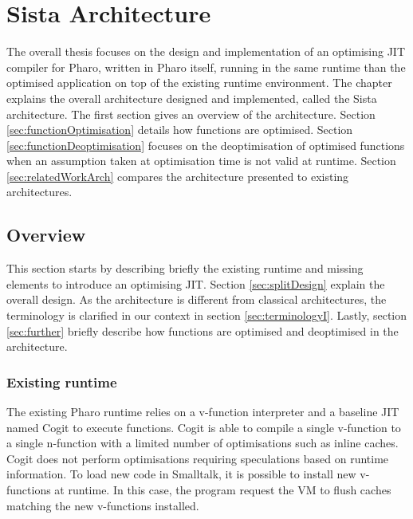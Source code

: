 \documentclass[a4paper,12pt,twoside]{../includes/ThesisStyle}
\begin{document}
\fi

\chapter{Sista Architecture}
\label{chap:architecture}
\minitoc

The overall thesis focuses on the design and implementation of an optimising JIT compiler for Pharo, written in Pharo itself, running in the same runtime than the optimised application on top of the existing runtime environment. The chapter explains the overall architecture designed and implemented, called the Sista architecture. The first section gives an overview of the architecture. Section \ref{sec:functionOptimisation} details how functions are optimised. Section \ref{sec:functionDeoptimisation} focuses on the deoptimisation of optimised functions when an assumption taken at optimisation time is not valid at runtime. Section \ref{sec:relatedWorkArch} compares the architecture presented to existing architectures.


\section{Overview}

This section starts by describing briefly the existing runtime and missing elements to introduce an optimising JIT. Section \ref{sec:splitDesign} explain the overall design. As the architecture is different from classical architectures, the terminology is clarified in our context in section \ref{sec:terminologyI}. Lastly, section \ref{sec:further} briefly describe how functions are optimised and deoptimised in the architecture. 

\subsection{Existing runtime}

The existing Pharo runtime relies on a v-function interpreter and a baseline JIT named Cogit to execute functions. Cogit is able to compile a single v-function to a single n-function with a limited number of optimisations such as inline caches. Cogit does not perform optimisations requiring speculations based on runtime information. To load new code in Smalltalk, it is possible to install new v-functions at runtime. In this case, the program request the VM to flush caches matching the new v-functions installed.
\end{document}
